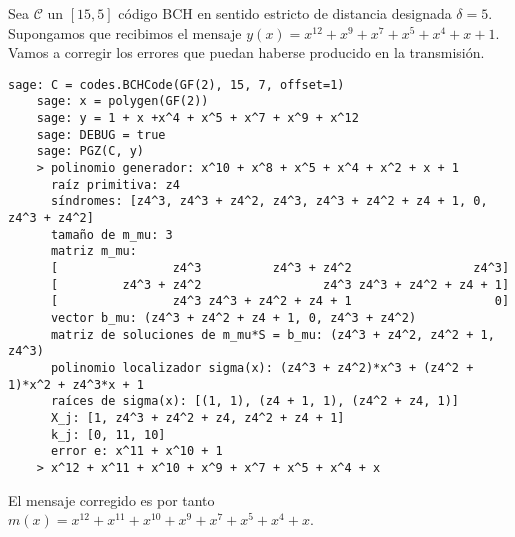\begin{example}
  Sea \(\mathcal C\) un \([15, 5]\) código BCH en sentido estricto de distancia designada \(\delta = 5\).
  Supongamos que recibimos el mensaje \(y(x) = x^{12} + x^9 + x^7 + x^5 + x^4 + x + 1\).
  Vamos a corregir los errores que puedan haberse producido en la transmisión.
  \begin{lstlisting}[gobble=4, breaklines=false, basicstyle=\small\ttfamily]
    sage: C = codes.BCHCode(GF(2), 15, 7, offset=1)
    sage: x = polygen(GF(2))
    sage: y = 1 + x +x^4 + x^5 + x^7 + x^9 + x^12
    sage: DEBUG = true
    sage: PGZ(C, y)
    > polinomio generador: x^10 + x^8 + x^5 + x^4 + x^2 + x + 1
      raíz primitiva: z4
      síndromes: [z4^3, z4^3 + z4^2, z4^3, z4^3 + z4^2 + z4 + 1, 0, z4^3 + z4^2]
      tamaño de m_mu: 3
      matriz m_mu: 
      [                z4^3          z4^3 + z4^2                 z4^3]
      [         z4^3 + z4^2                 z4^3 z4^3 + z4^2 + z4 + 1]
      [                z4^3 z4^3 + z4^2 + z4 + 1                    0]
      vector b_mu: (z4^3 + z4^2 + z4 + 1, 0, z4^3 + z4^2)
      matriz de soluciones de m_mu*S = b_mu: (z4^3 + z4^2, z4^2 + 1, z4^3)
      polinomio localizador sigma(x): (z4^3 + z4^2)*x^3 + (z4^2 + 1)*x^2 + z4^3*x + 1
      raíces de sigma(x): [(1, 1), (z4 + 1, 1), (z4^2 + z4, 1)]
      X_j: [1, z4^3 + z4^2 + z4, z4^2 + z4 + 1]
      k_j: [0, 11, 10]
      error e: x^11 + x^10 + 1
    > x^12 + x^11 + x^10 + x^9 + x^7 + x^5 + x^4 + x
  \end{lstlisting}
  El mensaje corregido es por tanto \(m(x) = x^{12} + x^{11} + x^{10} + x^9 + x^7 + x^5 + x^4 + x\).
\end{example}

